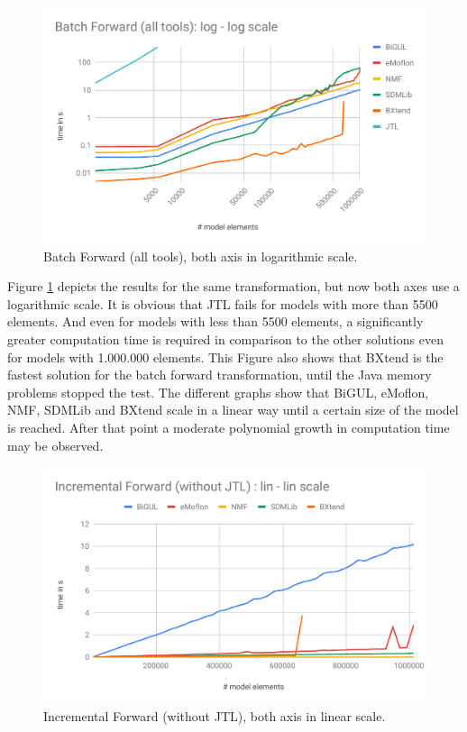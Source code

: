 \begin{figure}[h!]
	\centering
	\includegraphics[width=\columnwidth]{diagrams/scalability/BFloglog}
	\caption{Batch Forward (all tools), both axis in logarithmic scale.}
	\label{fig:scalabilityBatchFWDlog}
\end{figure}

Figure \ref{fig:scalabilityBatchFWDlog} depicts the results for the same transformation, but now both axes use a logarithmic scale. It is obvious that JTL fails for models with more than 5500 elements. And even for models with less than 5500 elements, a significantly greater computation time is required in comparison to the other solutions even for models with 1.000.000 elements. This Figure also shows that BXtend is the fastest solution for the batch forward transformation, until the Java memory problems stopped the test. The different graphs show that BiGUL, eMoflon, NMF, SDMLib and BXtend scale in a linear way until a certain size of the model is reached. After that point a moderate polynomial growth in computation time may be observed.


\begin{figure}[h!]
	\centering
	\includegraphics[width=\columnwidth]{diagrams/scalability/IFlinlin}
	\caption{Incremental Forward (without JTL), both axis in linear scale.}
	\label{fig:scalabilityIncrFWDlin}
\end{figure}

